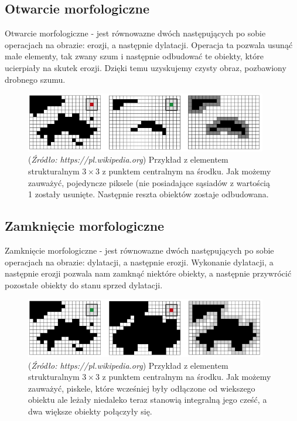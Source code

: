 \documentclass{article}
\begin{document}
        \subsection{Otwarcie morfologiczne}
        {
            \Large
            \justifying
            \quad
            Otwarcie morfologiczne - jest równowazne dwóch następujących po sobie operacjach na obrazie: erozji, a następnie dylatacji.
            Operacja ta pozwala usunąć małe elementy, tak zwany szum i następnie odbudować te obiekty, które ucierpiały na skutek erozji.
            Dzięki temu uzyskujemy czysty obraz, pozbawiony drobnego szumu.
        }
        \begin{figure}[H]
            \centering
            \includegraphics[width=400px]{otwarcie_przyklad.png}
            \caption{(\textit{Źródło: https://pl.wikipedia.org}) Przykład z elementem strukturalnym \(3 \times 3\) z punktem centralnym na środku.
            Jak możemy zauważyć, pojedyncze piksele (nie posiadające sąsiadów z wartością 1 zostały usunięte. Następnie reszta obiektów zostaje odbudowana.}
        \end{figure}
        \subsection{Zamknięcie morfologiczne}
        {
            \Large
            \justifying
            \quad
            Zamknięcie morfologiczne - jest równowazne dwóch następujących po sobie operacjach na obrazie: dylatacji, a następnie erozji.
            Wykonanie dylatacji, a następnie erozji pozwala nam zamknąć niektóre obiekty, a następnie przywrócić pozostałe obiekty do stanu sprzed dylatacji.
        }
        \begin{figure}[H]
            \centering
            \includegraphics[width=400px]{zamkniecie_przyklad.png}
            \caption{(\textit{Źródło: https://pl.wikipedia.org}) Przykład z elementem strukturalnym \(3 \times 3\) z punktem centralnym na środku.
            Jak możemy zauważyć, piskele, które wcześniej były odłączone od wiekszego obiektu ale leżały niedaleko teraz stanowią integralną jego cześć,
            a dwa większe obiekty połączyły się.}
        \end{figure}
\end{document}

